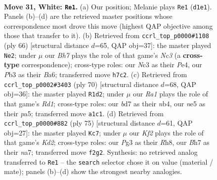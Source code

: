 \documentclass[11pt]{article}
\begin{document}
\clearpage

\begin{figure}[p]\centering
\begin{subfigure}{0.46\textwidth}\centering
\resizebox{\linewidth}{!}{%
\newchessgame
\chessboard[
  setfen={7r/3bk2B/1p2p3/p3n3/P5r1/1PN3P1/5K2/R2R4 w - - 2 31},
  showmover=false,
  pgfstyle=straightmove, color=movearrow, markmove={d1-e1}
]}
\caption{}
\end{subfigure}\hfill
\begin{subfigure}{0.46\textwidth}\centering
\resizebox{\linewidth}{!}{%
\newchessgame
\chessboard[
  setfen={6k1/5p2/B3bnpp/4R3/4P3/2N2P1P/2r3P1/6K1 w - - 1 34},
  showmover=false,
  pgfstyle=straightmove, color=movearrow, markmove={c3-e2}
]}
\caption{}
\end{subfigure}
\\[4pt]
\begin{subfigure}{0.46\textwidth}\centering
\resizebox{\linewidth}{!}{%
\newchessgame
\chessboard[
  setfen={6k1/1p6/3pN1p1/p2Pr3/1n1R3P/1Pr5/P6K/3R4 w - - 2 36},
  showmover=false,
  pgfstyle=straightmove, color=movearrow, markmove={d1-d2}
]}
\caption{}
\end{subfigure}\hfill
\begin{subfigure}{0.46\textwidth}\centering
\resizebox{\linewidth}{!}{%
\newchessgame
\chessboard[
  setfen={r6r/Np1k4/4p3/2Ppnp2/7R/P4PP1/6K1/1R6 b - - 2 38},
  showmover=false,
  pgfstyle=straightmove, color=movearrow, markmove={d7-c7}
]}
\caption{}
\end{subfigure}
\caption{\textbf{Move 31, White: \texttt{Re1}.} (a) Our position; Melanie plays \texttt{Re1} (\texttt{d1e1}). Panels (b)--(d) are the retrieved master positions whose correspondence most drove this move (highest QAP objective among those that transfer to it). (b) Retrieved from \texttt{ccrl\_top\_p0000\#1108} (ply 66) [structural distance $d$=65, QAP obj=37]: the master played \texttt{Ne2}; under $\mu$ our \emph{Bh7} plays the role of that game's \emph{Nc3} (a \textbf{cross-type} correspondence); cross-type roles: our \emph{N}c3 as their \emph{P}e4, our \emph{P}b3 as their \emph{B}a6; transferred move \texttt{h7c2}. (c) Retrieved from \texttt{ccrl\_top\_p0002\#3403} (ply 70) [structural distance $d$=68, QAP obj=36]: the master played \texttt{R1d2}; under $\mu$ our \emph{Ra1} plays the role of that game's \emph{Rd1}; cross-type roles: our \emph{b}d7 as their \emph{n}b4, our \emph{n}e5 as their \emph{p}a5; transferred move \texttt{a1c1}. (d) Retrieved from \texttt{ccrl\_top\_p0000\#882} (ply 75) [structural distance $d$=61, QAP obj=27]: the master played \texttt{Kc7}; under $\mu$ our \emph{Kf2} plays the role of that game's \emph{Kd2}; cross-type roles: our \emph{P}g3 as their \emph{R}h8, our \emph{B}h7 as their \emph{n}a7; transferred move \texttt{f2g2}. Synthesis: no retrieved analog transferred to \texttt{Re1} -- the \texttt{search} selector chose it on value (material / mate); panels (b)--(d) show the strongest nearby analogies.}
\label{fig:thought-m60}
\end{figure}
\end{document}
